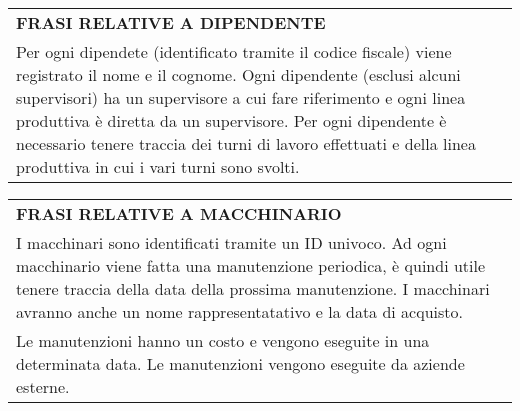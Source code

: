 \begin{center}
	\vspace{0.5cm}

	\begin{tabular}{P{16cm}}
		\toprule
		 \textbf {\large {FRASI RELATIVE A DIPENDENTE}}                                                                                                                                                                                                                                                                                                   \\
		Per ogni dipendete (identificato tramite il codice fiscale) viene registrato il nome e il cognome. Ogni dipendente (esclusi alcuni supervisori) ha un supervisore a cui fare riferimento e ogni linea produttiva è diretta da un supervisore. Per ogni dipendente è necessario tenere traccia dei turni di lavoro effettuati e della linea produttiva in cui i vari turni sono svolti. \\
		\bottomrule
	\end{tabular}

	\vspace{0.5cm}

	\begin{tabular}{P{16cm}}
		\toprule
		 \textbf {\large {FRASI RELATIVE A MACCHINARIO}}                                                                                                                                                                                    \\
		I macchinari sono identificati tramite un ID univoco. Ad ogni macchinario viene fatta una manutenzione periodica, è quindi utile tenere traccia della data della prossima manutenzione. I macchinari avranno anche un nome rappresentatativo e la data di acquisto. \\
		Le manutenzioni hanno un costo e vengono eseguite in una determinata data. Le manutenzioni vengono eseguite da aziende esterne.                                                                                                                                     \\
		\bottomrule
	\end{tabular}

\end{center}